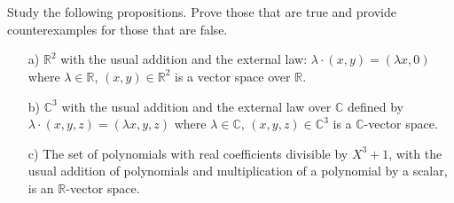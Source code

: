 \documentclass[12pt]{article}
\begin{document}
\section{}                                                                                                                                                                                                                               
Study the following propositions. Prove those that are true and provide counterexamples for those that are false.
\begin{enumerate}
    \item[a)] $\mathbb{R}^2$ with the usual addition and the external law: $\lambda \cdot (x, y) = (\lambda x, 0)$ where $\lambda \in \mathbb{R}$, $(x, y) \in \mathbb{R}^2$ is a vector space over $\mathbb{R}$.
    
    \item[b)] $\mathbb{C}^3$ with the usual addition and the external law over $\mathbb{C}$ defined by $\lambda \cdot (x, y, z) = (\lambda x, y, z)$ where $\lambda \in \mathbb{C}$, $(x, y, z) \in \mathbb{C}^3$ is a $\mathbb{C}$-vector space.
    
    \item[c)] The set of polynomials with real coefficients divisible by $X^3 + 1$, with the usual addition of polynomials and multiplication of a polynomial by a scalar, is an $\mathbb{R}$-vector space.
\end{enumerate}
                                                                                                                                                                                                                                         
\end{document}
